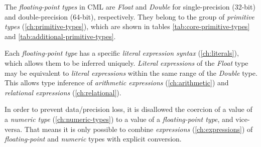 The \emph{floating-point types} in CML are \emph{Float} and \emph{Double}
for single-precision (32-bit) and double-precision (64-bit), respectively.
They belong to the group of \emph{primitive types} (\ref{ch:primitive-types}),
which are shown in tables \ref{tab:core-primitive-types} and \ref{tab:additional-primitive-types}.

Each \emph{floating-point type}
has a specific \emph{literal expression syntax} (\ref{ch:literals}),
which allows them to be inferred uniquely.
\emph{Literal expressions} of the \emph{Float} type may be equivalent
to \emph{literal expressions} within the same range of the \emph{Double} type.
This allows type inference of \emph{arithmetic expressions} (\ref{ch:arithmetic})
and \emph{relational expressions} (\ref{ch:relational}).

In order to prevent data/precision loss,
it is disallowed the coercion of a value of a \emph{numeric type}
(\ref{ch:numeric-types}) to a value of a \emph{floating-point type},
and vice-versa.
That means it is only possible to combine \emph{expressions} (\ref{ch:expressions})
of \emph{floating-point} and \emph{numeric} types
with explicit conversion.
